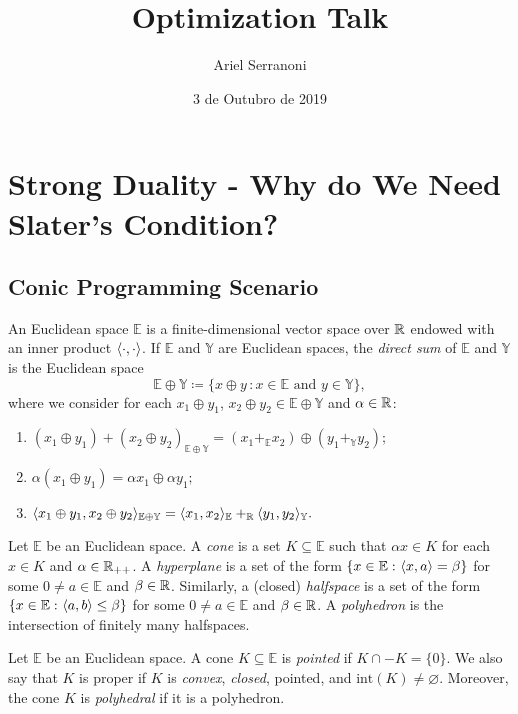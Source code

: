\documentclass[a4paper]{article}
\title{Optimization Talk}
\author{Ariel Serranoni}
\date{3 de Outubro de 2019}
\begin{document}
\section*{Strong Duality - Why do We Need Slater's Condition?}
\subsection*{Conic Programming Scenario}

An Euclidean space \(\mathbb{E}\) is a finite-dimensional vector space over \(\mathbb{R}\) endowed with an inner product \(\langle \cdot,\cdot \rangle\). If \(\mathbb{E}\) and \(\mathbb{Y}\) are Euclidean spaces, the \emph{direct sum} of \(\mathbb{E}\) 
and \(\mathbb{Y}\) is the Euclidean space 
\[\mathbb{E}\oplus\mathbb{Y}\coloneqq\{x\oplus y\,\colon x\in\mathbb{E}\text{ and }y\in\mathbb{Y}\},\]
where we consider for each \(x_1\oplus y_1\), \(x_2\oplus
y_2\in\mathbb{E}\oplus\mathbb{Y}\) and \(\alpha\in\mathbb{R}\):
\begin{enumerate}[label=(\roman*)]
 \item \((x_1\oplus y_1)+(x_2\oplus y_2)_{\mathbb{E}\oplus\mathbb{Y}}=(x_1+_{\mathbb{E}}x_2)\oplus(y_1+_{\mathbb{Y}}y_2);\)
 \item \(\alpha(x_1\oplus y_1)=\alpha x_1\oplus \alpha y_1;\)
 \item \(\langle x_1\oplus y_1,x_2\oplus y_2 \rangle_{\mathbb{E}\oplus\mathbb{Y}}=\langle x_1,x_2 \rangle_{\mathbb{E}}+_{\mathbb{R}}\langle y_1,y_2 \rangle_{\mathbb{Y}}.\)
  \end{enumerate}
\begin{definition}
Let \(\mathbb{E}\) be an Euclidean space.  A \emph{cone} is a set \(K\subseteq\mathbb{E}\) such that \(\alpha x\in K\) for each \(x\in K\) and \(\alpha\in\mathbb{R}_{++}\).
A \emph{hyperplane} is a set of the form \(\{x\in\mathbb{E}\,\colon \langle x,a \rangle=\beta\}\) for some \(0\not = a\in\mathbb{E}\) and \(\beta\in\mathbb{R}\). Similarly, a (closed) \emph{halfspace} is a set of the form
\(\{x\in\mathbb{E}\,\colon\langle a,b \rangle\leq \beta\}\) for some \(0\not= a\in\mathbb{E}\) and \(\beta\in\mathbb{R}\). A \emph{polyhedron} is the intersection of finitely many halfspaces.
\end{definition}

\begin{definition}
Let \(\mathbb{E}\) be an Euclidean space. A cone \(K\subseteq\mathbb{E}\) is \emph{pointed} if \(K\cap -K=\{0\}\). 
We also say that \(K\) is proper if \(K\) is \emph{convex}, \emph{closed}, pointed, and \(\text{int}(K)\not=\varnothing\).
Moreover, the cone \(K\) is \emph{polyhedral} if it is a polyhedron.
\end{definition}
\end{document}
